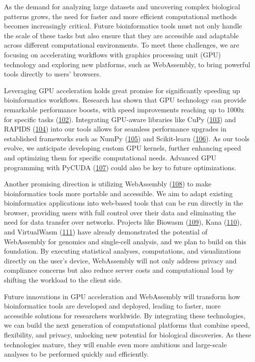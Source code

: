 As the demand for analyzing large datasets and uncovering complex biological patterns grows, the need for faster and more efficient computational methods becomes increasingly critical.
Future bioinformatics tools must not only handle the scale of these tasks but also ensure that they are accessible and adaptable across different computational environments.
To meet these challenges, we are focusing on accelerating workflows with graphics processing unit (GPU) technology and exploring new platforms, such as WebAssembly, to bring powerful tools directly to users' browsers.

Leveraging GPU acceleration holds great promise for significantly speeding up bioinformatics workflows.
Research has shown that GPU technology can provide remarkable performance boosts, with speed improvements reaching up to 1000x for specific tasks (\protect\hyperlink{ref-1EIbaYHGq}{102}).
Integrating GPU-aware libraries like CuPy (\protect\hyperlink{ref-4iZVPVHz}{103}) and RAPIDS (\protect\hyperlink{ref-wPsNXL1Q}{104}) into our tools allows for seamless performance upgrades in established frameworks such as NumPy (\protect\hyperlink{ref-1LexfAxj}{105}) and Scikit-learn (\protect\hyperlink{ref-AujvwLp6}{106}).
As our tools evolve, we anticipate developing custom GPU kernels, further enhancing speed and optimizing them for specific computational needs.
Advanced GPU programming with PyCUDA (\protect\hyperlink{ref-b5xmRoLZ}{107}) could also be key to future optimizations.

Another promising direction is utilizing WebAssembly (\protect\hyperlink{ref-ITQaZvrQ}{108}) to make bioinformatics tools more portable and accessible.
We aim to adapt existing bioinformatics applications into web-based tools that can be run directly in the browser, providing users with full control over their data and eliminating the need for data transfer over networks.
Projects like Biowasm (\protect\hyperlink{ref-Z0f406Zs}{109}), Kana (\protect\hyperlink{ref-1DswCJYT0}{110}), and VirtualWasm (\protect\hyperlink{ref-WhJVE7a4}{111}) have already demonstrated the potential of WebAssembly for genomics and single-cell analysis, and we plan to build on this foundation.
By executing statistical analyses, computations, and visualizations directly on the user's device, WebAssembly will not only address privacy and compliance concerns but also reduce server costs and computational load by shifting the workload to the client side.

Future innovations in GPU acceleration and WebAssembly will transform how bioinformatics tools are developed and deployed, leading to faster, more accessible solutions for researchers worldwide.
By integrating these technologies, we can build the next generation of computational platforms that combine speed, flexibility, and privacy, unlocking new potential for biological discoveries.
As these technologies mature, they will enable even more ambitious and large-scale analyses to be performed quickly and efficiently.

